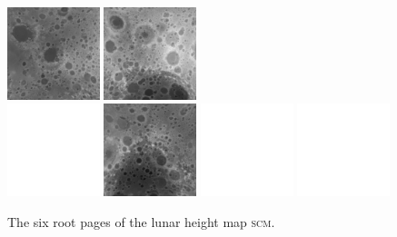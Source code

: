 \documentclass[oneside,10pt]{memoir}
\newcommand{\scm}     {\textsc{scm}}
\begin{document}
\begin{Spacing}{1.1}
\begin{figure}
  \includegraphics[width=0.24\textwidth]{fig/dtmh0.png}
  \includegraphics[width=0.24\textwidth]{fig/dtmh5.png}\\\vspace{1pt}
  \includegraphics[width=0.24\textwidth]{fig/blank.pdf}
  \includegraphics[width=0.24\textwidth]{fig/dtmh3.png}
  \includegraphics[width=0.24\textwidth]{fig/blank.pdf}
  \includegraphics[width=0.24\textwidth]{fig/blank.pdf}
  \caption{The six root pages of the lunar height map \scm.}
  \label{fig:dtmh}
\end{figure}


\end{Spacing}
\end{document}
